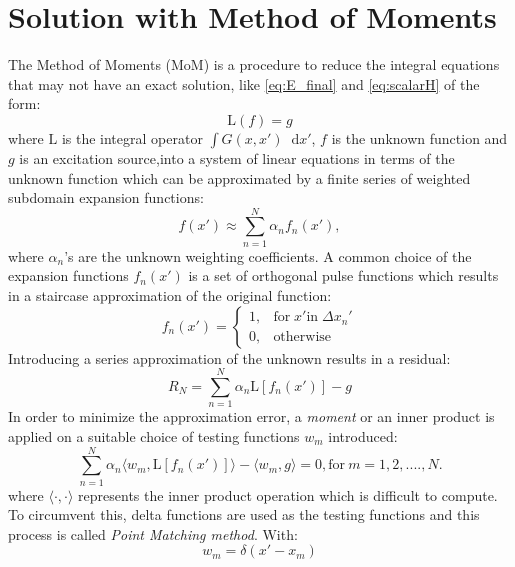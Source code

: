 \documentclass[11pt]{article}
\renewcommand{\^}{\hat}  %
\newcommand*\diff{\mathop{}\!\mathrm{d}} %
\begin{document}
\section*{Solution with Method of Moments}

The Method of Moments (MoM) is a procedure to reduce the integral equations that may not have an exact solution, like \eqref{eq:E_final} and \eqref{eq:scalarH} of the form:
%
\begin{equation}
  \mathrm L (f) = g
  \label{eq:MoM}
\end{equation}
%
where $\mathrm L$ is the integral operator $\int G(x,x') \diff{x'}$, $f$ is the unknown function and $g$ is an excitation source,into a system of linear equations in terms of the unknown function which can be approximated by a finite series of weighted subdomain expansion functions:
\begin{equation}
  f(x') \approx \sum\limits_{n = 1}^N \alpha_n f_n(x'),
  \label{eq:MOM_f}
\end{equation}
%
where $\alpha_n$'s are the unknown weighting coefficients. A common choice of  the expansion functions $f_n(x')$ is a set of orthogonal pulse functions which results in a staircase approximation of the original function:
%
\begin{equation}
  f_n(x') =
  \begin{cases}
    1, & \text{for}\; x' \text{in}\; \Delta x_n'  \\
    0, & \text{otherwise}
  \end{cases}
  \label{eq:pulse}
\end{equation}
%
Introducing a series approximation of the unknown results in a residual:
\begin{equation}
  R_N = \sum \limits_{n = 1}^N \alpha_n \mathrm L [f_n(x')] - g
  \label{eq:residual}
\end{equation}
%
In order to minimize the approximation error, a \emph{moment} or an inner product is applied on a suitable choice of testing functions $w_m$ introduced:
%
\begin{equation}
  \sum \limits_{n = 1}^N \alpha_n \langle w_m, \mathrm L [f_n(x')] \rangle - \langle w_m, g \rangle = 0, \text{for}\ m = 1,2,....,N.
  \label{eq:moment}
\end{equation}
%
where $\langle \cdot, \cdot \rangle$ represents the inner product operation which is difficult to compute. To circumvent this, delta functions are used as the testing functions and this process is called \emph{ Point Matching method}. With:
%
\begin{equation}
  w_m = \delta(x' - x_m)
  \label{eq:delta}
\end{equation}
\end{document}
